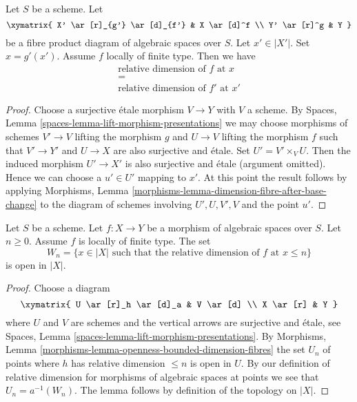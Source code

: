 \begin{lemma}
\label{lemma-dimension-fibre-after-base-change}
Let $S$ be a scheme. Let
$$
\xymatrix{
X' \ar[r]_{g'} \ar[d]_{f'} & X \ar[d]^f \\
Y' \ar[r]^g & Y
}
$$
be a fibre product diagram of algebraic spaces over $S$.
Let $x' \in |X'|$. Set $x = g'(x')$.
Assume $f$ locally of finite type.
Then we have
$$
\begin{matrix}
\text{relative dimension of }f\text{ at }x \\
= \\
\text{relative dimension of }f'\text{ at }x'
\end{matrix}
$$
\end{lemma}

\begin{proof}
Choose a surjective \'etale morphism $V \to Y$ with $V$ a scheme.
By
Spaces, Lemma \ref{spaces-lemma-lift-morphism-presentations}
we may choose morphisms of schemes $V' \to V$ lifting the morphism $g$ and
$U \to V$ lifting the morphism $f$ such that $V' \to Y'$
and $U \to X$ are also surjective and \'etale. Set $U' = V' \times_V U$.
Then the induced morphism $U' \to X'$ is also surjective and
\'etale (argument omitted). Hence we can choose a $u' \in U'$
mapping to $x'$. At this point the result follows by applying
Morphisms, Lemma \ref{morphisms-lemma-dimension-fibre-after-base-change}
to the diagram of schemes involving $U', U, V', V$ and the point $u'$.
\end{proof}

\begin{lemma}
\label{lemma-openness-bounded-dimension-fibres}
Let $S$ be a scheme.
Let $f : X \to Y$ be a morphism of algebraic spaces over $S$.
Let $n \geq 0$. Assume $f$ is locally of finite type.
The set
$$
W_n = \{x \in |X|
\text{ such that the relative dimension of }f\text{ at } x \leq n\}
$$
is open in $|X|$.
\end{lemma}

\begin{proof}
Choose a diagram
$$
\xymatrix{
U \ar[r]_h \ar[d]_a & V \ar[d] \\
X \ar[r] & Y
}
$$
where $U$ and $V$ are schemes and the vertical arrows are surjective and
\'etale, see
Spaces, Lemma \ref{spaces-lemma-lift-morphism-presentations}.
By
Morphisms, Lemma \ref{morphisms-lemma-openness-bounded-dimension-fibres}
the set $U_n$ of points where $h$ has relative dimension
$\leq n$ is open in $U$. By our definition of relative dimension
for morphisms of algebraic spaces at points we see that
$U_n = a^{-1}(W_n)$.
The lemma follows by definition of the topology on $|X|$.
\end{proof}

